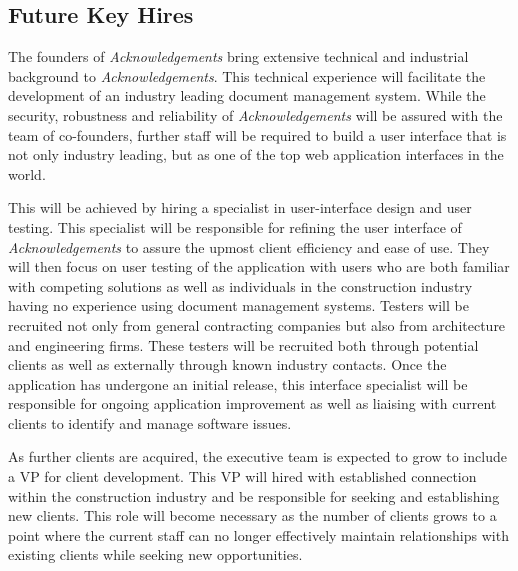 \subsection{Future Key Hires}
The founders of {\it Acknowledgements} bring extensive technical and industrial background to {\it Acknowledgements}. This technical experience will facilitate the development of an industry leading document management system. While the security, robustness and reliability of {\it Acknowledgements} will be assured with the team of co-founders, further staff will be required to build a user interface that is not only industry leading, but as one of the top web application interfaces in the world.

This will be achieved by hiring a specialist in user-interface design and user testing. This specialist will be responsible for refining the user interface of {\it Acknowledgements} to assure the upmost client efficiency and ease of use. They will then focus on user testing of the application with users who are both familiar with competing solutions as well as individuals in the construction industry having no experience using document management systems. Testers will be recruited not only from general contracting companies but also from architecture and engineering firms. These testers will be recruited both through potential clients as well as externally through known industry contacts. Once the application has undergone an initial release, this interface specialist will be responsible for ongoing application improvement as well as liaising with current clients to identify and manage software issues.

As further clients are acquired, the executive team is expected to grow to include a VP for client development. This VP will hired with established connection within the construction industry and be responsible for seeking and establishing new clients. This role will become necessary as the number of clients grows to a point where the current staff can no longer effectively maintain relationships with existing clients while seeking new opportunities.